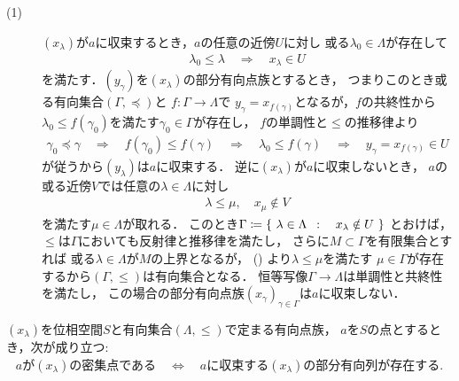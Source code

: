 	\begin{prf}\mbox{}
		\begin{description}
			\item[(1)]
				$(x_\lambda)$が$a$に収束するとき，$a$の任意の近傍$U$に対し
				或る$\lambda_0 \in \Lambda$が存在して
				\begin{align}
					\lambda_0 \leq \lambda
					\quad \Longrightarrow \quad
					x_\lambda \in U
				\end{align}
				を満たす．$(y_\gamma)$を$(x_\lambda)$の部分有向点族とするとき，
				つまりこのとき或る有向集合$(\Gamma,\preceq)$と
				$f:\Gamma \longrightarrow \Lambda$で
				$y_\gamma = x_{f(\gamma)}$となるが，$f$の共終性から
				$\lambda_0 \leq f(\gamma_0)$を満たす$\gamma_0 \in \Gamma$が存在し，
				$f$の単調性と$\leq$の推移律より
				\begin{align}
					\gamma_0 \preceq \gamma
					\quad \Longrightarrow \quad
					f(\gamma_0) \leq f(\gamma)
					\quad \Longrightarrow \quad
					\lambda_0 \leq f(\gamma)
					\quad \Longrightarrow \quad
					y_\gamma = x_{f(\gamma)} \in U
				\end{align}
				が従うから$(y_\lambda)$は$a$に収束する．
				逆に$(x_\lambda)$が$a$に収束しないとき，
				$a$の或る近傍$V$では任意の$\lambda \in \Lambda$に対し
				\begin{align}
					\lambda \leq \mu,
					\quad x_\mu \notin V
					\label{eq:thm_a_net_converges_iff_every_subnet_converges_1}
				\end{align}
				を満たす$\mu \in \Lambda$が取れる．
				このとき$\Gamma \coloneqq \left\{\ \lambda \in \Lambda\ \, : \quad x_\lambda \notin U\ \right\}$
				とおけば，$\leq$は$\Gamma$においても反射律と推移律を満たし，
				さらに$M \subset \Gamma$を有限集合とすれば
				或る$\lambda \in \Lambda$が$M$の上界となるが，
				()
				より$\lambda \leq \mu$を満たす
				$\mu \in \Gamma$が存在するから$(\Gamma,\leq)$は有向集合となる．
				恒等写像$\Gamma \longrightarrow \Lambda$は単調性と共終性を満たし，
				この場合の部分有向点族$(x_\gamma)_{\gamma \in \Gamma}$は$a$に収束しない．
		\end{description}
		\QED
	\end{prf}
	
	\begin{screen}
		\begin{thm}[有向点族の密集点に対する部分収束点族の存在]
			$(x_\lambda)$を位相空間$S$と有向集合$(\Lambda,\leq)$で定まる有向点族，
			$a$を$S$の点とするとき，次が成り立つ:
			\begin{align}
				\mbox{$a$が$(x_\lambda)$の密集点である}
				\quad \Longleftrightarrow \quad
				\mbox{$a$に収束する$(x_\lambda)$の部分有向列が存在する}.
			\end{align}
		\end{thm}
	\end{screen}